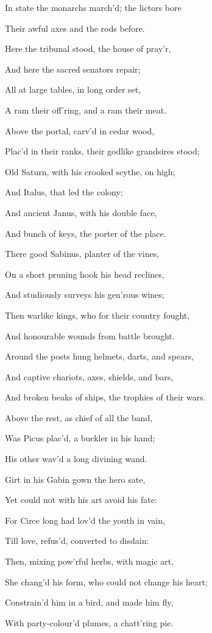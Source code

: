 In state the monarchs march’d; the lictors bore

Their awful axes and the rods before.

Here the tribunal stood, the house of pray’r,

And here the sacred senators repair;

All at large tables, in long order set,

A ram their off’ring, and a ram their meat.

Above the portal, carv’d in cedar wood,

Plac’d in their ranks, their godlike grandsires stood;

Old Saturn, with his crooked scythe, on high;

And Italus, that led the colony;

And ancient Janus, with his double face,

And bunch of keys, the porter of the place.

There good Sabinus, planter of the vines,

On a short pruning hook his head reclines,

And studiously surveys his gen’rous wines;

Then warlike kings, who for their country fought,

And honourable wounds from battle brought.

Around the posts hung helmets, darts, and spears,

And captive chariots, axes, shields, and bars,

And broken beaks of ships, the trophies of their wars.

Above the rest, as chief of all the band,

Was Picus plac’d, a buckler in his hand;

His other wav’d a long divining wand.

Girt in his Gabin gown the hero sate,

Yet could not with his art avoid his fate:

For Circe long had lov’d the youth in vain,

Till love, refus’d, converted to disdain:

Then, mixing pow’rful herbs, with magic art,

She chang’d his form, who could not change his heart;

Constrain’d him in a bird, and made him fly,

With party-colour’d plumes, a chatt’ring pie.

